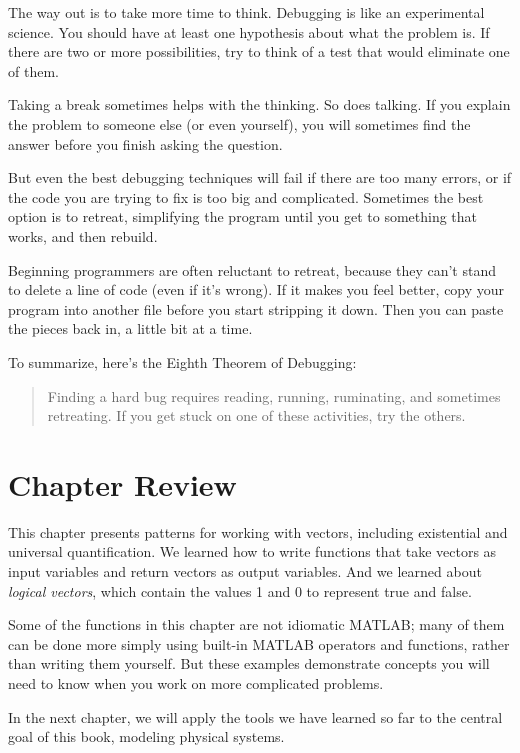 
The way out is to take more time to think.  Debugging is like an
experimental science.  You should have at least one hypothesis about
what the problem is.  If there are two or more possibilities, try to
think of a test that would eliminate one of them.


Taking a break sometimes helps with the thinking.  So does talking.
If you explain the problem to someone else (or even yourself), you
will sometimes find the answer before you finish asking the question.

But even the best debugging techniques will fail if there are too many
errors, or if the code you are trying to fix is too big and
complicated.  Sometimes the best option is to retreat, simplifying the
program until you get to something that works, and then rebuild.

Beginning programmers are often reluctant to retreat, because
they can't stand to delete a line of code (even if it's wrong).
If it makes you feel better, copy your program into another file
before you start stripping it down.  Then you can paste the pieces
back in, a little bit at a time.


To summarize, here's the Eighth Theorem of Debugging:

\begin{quote}
Finding a hard bug requires reading, running, ruminating,
and sometimes retreating.  If you get stuck on one of these
activities, try the others.
\end{quote}

\section{Chapter Review}

This chapter presents patterns for working with vectors, including existential and universal quantification.
We learned how to write functions that take vectors as input variables and return vectors as output variables.
And we learned about \emph{logical vectors}, which contain the values 1 and 0 to represent true and false.

Some of the functions in this chapter are not idiomatic MATLAB; many of them can be done more simply using built-in MATLAB operators and functions, rather than writing them yourself.  But these examples demonstrate concepts you will need to know when you work on more complicated problems.

In the next chapter, we will apply the tools we have learned so far to the central goal of this book, modeling physical systems.





